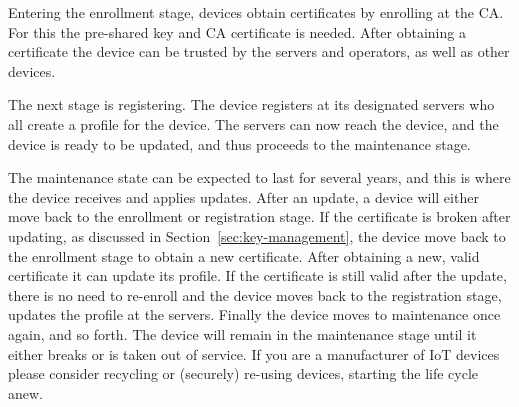 \documentclass[0-thesis.tex]{subfiles}
\begin{document}
Entering the enrollment stage, devices obtain certificates by enrolling at the CA. For
this the pre-shared key and CA certificate is needed. After obtaining a certificate the
device can be trusted by the servers and operators, as well as other devices. 

The next stage is registering. The device registers at its designated servers who all
create a profile for the device. The servers can now reach the device, and the device is
ready to be updated, and thus proceeds to the maintenance stage.

The maintenance state can be expected to last for several years, and this is where the
device receives and applies updates. After an update, a device will either move back to
the enrollment or registration stage. If the certificate is broken after updating, as
discussed in Section~\ref{sec:key-management}, the device move back to the enrollment
stage to obtain a new certificate. After obtaining a new, valid certificate it can update
its profile. If the certificate is still valid after the update, there is no need to
re-enroll and the device moves back to the registration stage, updates the profile at the
servers. Finally the device moves to maintenance once again, and so forth. The device will
remain in the maintenance stage until it either breaks or is taken out of service. If you
are a manufacturer of IoT devices please consider recycling or (securely) re-using
devices, starting the life cycle anew.
\end{document}
